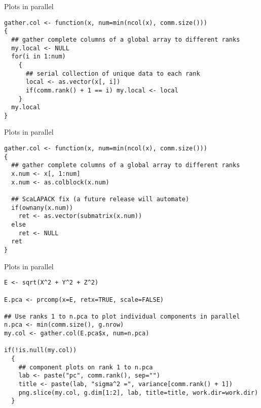 \begin{frame}
  \begin{exampleblock}{Plots in parallel}\pause
\begin{lstlisting}[title=gather.col Second Attempt (2\_plot.r)]
gather.col <- function(x, num=min(ncol(x), comm.size()))
{
  ## gather complete columns of a global array to different ranks
  my.local <- NULL
  for(i in 1:num)
    {
      ## serial collection of unique data to each rank
      local <- as.vector(x[, i])
      if(comm.rank() + 1 == i) my.local <- local
    }
  my.local
}
\end{lstlisting}
  \end{exampleblock}
\end{frame}

\begin{frame}
  \begin{exampleblock}{Plots in parallel}\pause
\begin{lstlisting}[title=gather.col The Right Way (3\_plot.r)]
gather.col <- function(x, num=min(ncol(x), comm.size()))
{
  ## gather complete columns of a global array to different ranks
  x.num <- x[, 1:num]
  x.num <- as.colblock(x.num)

  ## ScaLAPACK fix (a future release will automate)
  if(ownany(x.num))
    ret <- as.vector(submatrix(x.num))
  else
    ret <- NULL
  ret
}
\end{lstlisting}
  \end{exampleblock}
\end{frame}

\begin{frame}
  \begin{exampleblock}{Plots in parallel}\pause
\begin{lstlisting}[title=Now Plot the PCA Components (4\_plot.r)]
E <- sqrt(X^2 + Y^2 + Z^2)

E.pca <- prcomp(x=E, retx=TRUE, scale=FALSE)

## Use ranks 1 to n.pca to plot individual components in parallel
n.pca <- min(comm.size(), g.nrow)
my.col <- gather.col(E.pca$x, num=n.pca)

if(!is.null(my.col))
  {
    ## component plots on rank 1 to n.pca
    lab <- paste("pc", comm.rank(), sep="")
    title <- paste(lab, "sigma^2 =", variance[comm.rank() + 1])
    png.slice(my.col, g.dim[1:2], lab, title=title, work.dir=work.dir)
  }
\end{lstlisting} %
  \end{exampleblock}
\end{frame}

